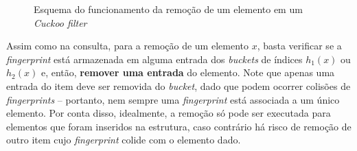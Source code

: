 \documentclass[12pt,twoside,english,brazilian]{article}
\begin{document}
\begin{figure}
    \begin{center}
        \caption{\label{cuckoo-filter-remove} Esquema do funcionamento da remoção de um elemento em um \textit{Cuckoo filter}}
    \end{center}
\end{figure}

Assim como na consulta, para a remoção de um elemento $x$, basta verificar se a \textit{fingerprint} está armazenada em alguma entrada dos \textit{buckets} de índices $h_1(x)$ ou $h_2(x)$ e, então, \textbf{remover uma entrada} do elemento. Note que apenas uma entrada do item deve ser removida do \textit{bucket}, dado que podem ocorrer colisões de \textit{fingerprints} -- portanto, nem sempre uma \textit{fingerprint} está associada a um único elemento. Por conta disso, idealmente, a remoção só pode ser executada para elementos que foram inseridos na estrutura, caso contrário há risco de remoção de outro item cujo \textit{fingerprint} colide com o elemento dado.
\end{document}

